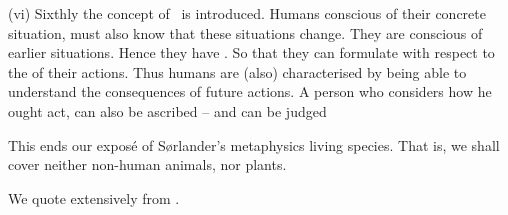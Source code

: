 \begynd
\pind  (vi) Sixthly the concept of 
      \ is introduced.
\begynd
\pind Humans conscious of their concrete situation, must also know
      that these situations change.
\pind They are conscious of earlier situations. 
\pind Hence they have .
\pind So that they can formulate  with respect to the
       of their actions.
\pind Thus humans are (also) characterised by being able to
      understand the consequences of future actions.
\pind A person who considers how he ought act, can also be ascribed
       --
\pind and can be judged 
\afslut
\afslut

\treprikker

\noindent
\mnewfoil
\begynd
\pind This ends our expos{\'e} of S{\o}rlander's metaphysics  living species.
\begynd
\pind That is, we shall cover
\begynd
\pind neither non-human animals, 
\pind nor plants.
\afslut
\afslut
\afslut

\label{3:Philosophy, Science and the Arts}

\begynd
\pind We quote extensively from \cite[Kai S{\o}rlander,
1997]{kaisorlander1997}\HHHH.
\afslut

